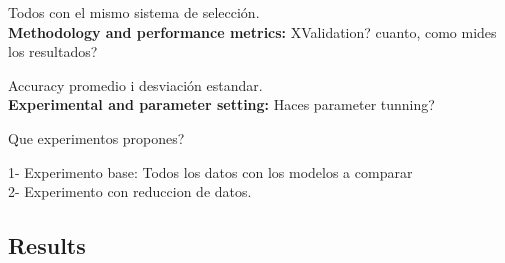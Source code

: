 Todos con el mismo sistema de selección.
\\
{\bf Methodology and performance metrics:} XValidation? cuanto, como mides los resultados?

Accuracy promedio i desviación estandar.
\\
{\bf Experimental and parameter setting:}
Haces parameter tunning?

Que experimentos propones?

1- Experimento base: Todos los datos con los modelos a comparar\\
2- Experimento con reduccion de datos.


\subsection{Results}
